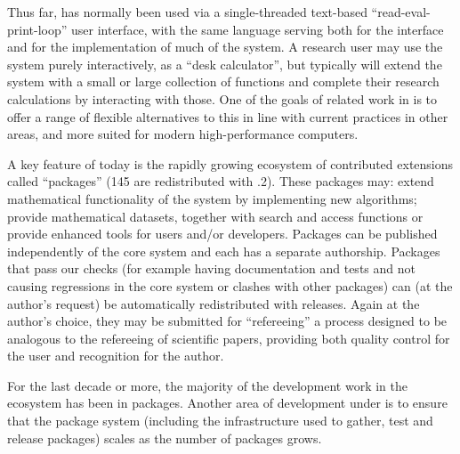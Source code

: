 Thus far, \GAP has
normally been used via a single-threaded text-based ``read-eval-print-loop'' user interface, with the
same \GAP language serving both for the interface and for the
implementation of much of the system. A research user 
may use the system purely interactively, as a ``desk calculator'', but
typically will extend the system with a small or large collection of
\GAP functions and complete their research calculations by interacting
with those. One of the goals of \GAP related work in \ODK is to offer
a range of flexible alternatives to this in line with current
practices in other areas, and more suited for modern high-performance
computers.

A key feature of \GAP today is the rapidly growing ecosystem of
contributed extensions called ``packages'' (145 are redistributed with
.2). These packages may: extend mathematical functionality of
the system by implementing new algorithms; provide mathematical
datasets, together with search and access functions or provide
enhanced tools for users and/or developers. Packages can be published
independently of the core \GAP system and each has a separate
authorship. Packages that pass our checks (for example having
documentation and tests and not causing regressions in the core system
or clashes with other packages) can (at the author's request) be
automatically redistributed with \GAP releases. Again at the author's
choice, they may be
submitted for ``refereeing'' a process designed to be analogous to the
refereeing of scientific papers, providing both quality control for
the user and recognition for the author.

For the last decade or more, the majority of the
development work in the \GAP ecosystem has been in packages.
Another area of \GAP development under \ODK is to ensure
that the package system (including the infrastructure used to gather,
test and release packages) scales as the number of packages grows.


